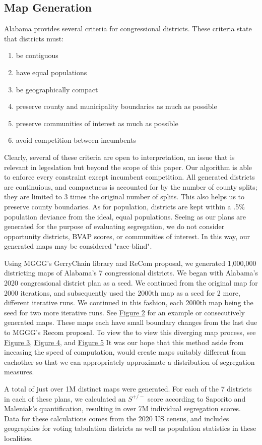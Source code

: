 \documentclass{article}
\begin{document}
\subsection{Map Generation}\label{generation}

Alabama provides several criteria for congressional districts. These criteria state that districts must:

\begin{enumerate}
	\item be contiguous
	\item have equal populations
    \item be geographically compact
    \item preserve county and municipality boundaries as much as possible
    \item preserve communities of interest as much as possible
    \item avoid competition between incumbents
\end{enumerate}

Clearly, several of these criteria are open to interpretation, an issue that is relevant in legeslation but beyond the scope of this paper. Our algorithm is able to enforce every constraint except incumbent competition. All generated districts are continuious, and compactness is accounted for by the number of county splits; they are limited to 3 times the original number of splits. This also helps us to preserve county boundaries. As for population, districts are kept within a .5\% population deviance from the ideal, equal populations. Seeing as our plans are generated for the purpose of evaluating segregation, we do not consider opportunity districts, BVAP scores, or communities of interest. In this way, our generated maps may be considered "race-blind".
\par
Using MGGG’s GerryChain library and ReCom proposal, we generated 1,000,000 districting maps of Alabama’s 7 congressional districts. We began with Alabama’s 2020 congressional district plan as a seed. We continued from the original map for 2000 iterations, and subsequently used the 2000th map as a seed for 2 more, different iterative runs. We continued in this fashion, each 2000th map being the seed for two more iterative runs. See \hyperref[iterative map]{Figure 2} for an example or consecutively generated maps. These maps each have small boundary changes from the last due to MGGG's Recom proposal. To view the to view this diverging map process, see \hyperref[diverge 1]{Figure 3}, \hyperref[diverge 10]{Figure 4}, and \hyperref[diverge 100]{Figure 5} It was our hope that this method aside from inceasing the speed of computation, would create maps suitably different from eachother so that we can appropriately approximate a distribution of segregation measures.
\par
A total of just over 1M distinct maps were generated. For each of the 7 districts in each of these plans, we calculated an $S^{+/-}$ score according to Saporito and Maleniak’s quantification, resulting in over 7M individual segregation scores. Data for these calculations comes from the 2020 US census, and includes geographies for voting tabulation districts as well as population statistics in these localities. 
\end{document}
